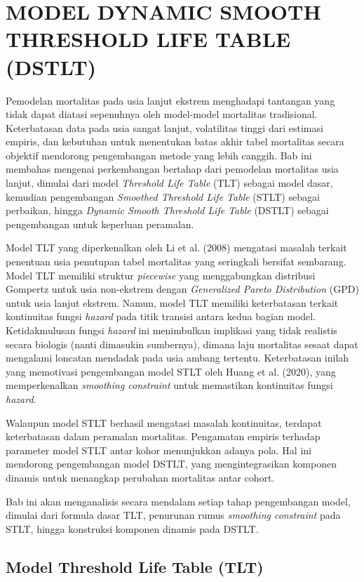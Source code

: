 \chapter{\normalsize MODEL DYNAMIC SMOOTH THRESHOLD LIFE TABLE (DSTLT)}

Pemodelan mortalitas pada usia lanjut ekstrem menghadapi tantangan yang tidak dapat diatasi sepenuhnya oleh model-model mortalitas tradisional. Keterbatasan data pada usia sangat lanjut, volatilitas tinggi dari estimasi empiris, dan kebutuhan untuk menentukan batas akhir tabel mortalitas secara objektif mendorong pengembangan metode yang lebih canggih. Bab ini membahas mengenai perkembangan bertahap dari pemodelan mortalitas usia lanjut, dimulai dari model \textit{Threshold Life Table} (TLT) sebagai model dasar, kemudian pengembangan \textit{Smoothed Threshold Life Table} (STLT) sebagai perbaikan, hingga \textit{Dynamic Smooth Threshold Life Table} (DSTLT) sebagai pengembangan untuk keperluan peramalan.

Model TLT yang diperkenalkan oleh Li et al. (2008) mengatasi masalah terkait penentuan usia penutupan tabel mortalitas yang seringkali bersifat sembarang. Model TLT memiliki struktur \textit{piecewise} yang menggabungkan distribusi Gompertz untuk usia non-ekstrem dengan \textit{Generalized Pareto Distribution} (GPD) untuk usia lanjut ekstrem. Namun, model TLT memiliki keterbatasan terkait kontinuitas fungsi \textit{hazard} pada titik transisi antara kedua bagian model. Ketidakmulusan fungsi \textit{hazard} ini menimbulkan implikasi yang tidak realistis secara biologis (nanti dimasukin sumbernya), dimana laju mortalitas sesaat dapat mengalami loncatan mendadak pada usia ambang tertentu. Keterbatasan inilah yang memotivasi pengembangan model STLT oleh Huang et al. (2020), yang memperkenalkan \textit{smoothing constraint} untuk memastikan kontinuitas fungsi \textit{hazard}.

Walaupun model STLT berhasil mengatasi masalah kontinuitas, terdapat keterbatasan dalam peramalan mortalitas. Pengamatan empiris terhadap parameter model STLT antar kohor menunjukkan adanya pola. Hal ini mendorong pengembangan model DSTLT, yang mengintegrasikan komponen dinamis untuk menangkap perubahan mortalitas antar cohort.

Bab ini akan menganalisis secara mendalam setiap tahap pengembangan model, dimulai dari formula dasar TLT, penurunan rumus \textit{smoothing constraint} pada STLT, hingga konstruksi komponen dinamis pada DSTLT.

\section{Model Threshold Life Table (TLT)}

